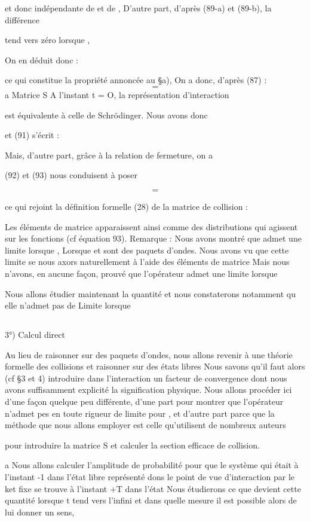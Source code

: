 {{{et donc indépendante de  et de ,
D'autre part, d'après (89-a) et (89-b), la différence

tend vers zéro lorsque ,

On en déduit donc :

ce qui constitue la propriété annoncée au \S a),
On a donc, d'après (87) :
\[
\tag{91}=
\]
a Matrice S
A l'instant t = O, la représentation d'interaction

est équivalente à celle de Schrödinger. Nous avons donc

et (91) s'écrit :

Mais, d'autre part, grâce à la relation de fermeture, on a


(92) et (93) nous conduisent à poser

\[
\tag{94}=
\]

ce qui rejoint la définition formelle (28) de la matrice de collision :

Les éléments de matrice  apparaissent ainsi comme des distributions
qui agissent sur les fonctions (cf équation 93).
Remarque : 
Nous avons montré que  admet une limite lorsque
, Lorsque  et  sont des paquets d'ondes.
Nous avons vu que cette limite se nous axors naturellement à l'aide
des éléments de matrice
Mais nous n'avons, en aucune façon, prouvé que l'opérateur 
admet une limite lorsque 

Nous allons étudier maintenant la quantité
et nous constaterons notamment qu elle n'admet pas de Limite lorsque

\subsection{}%
3°) Calcul direct 

Au lieu de raisonner sur des paquets d'ondes, nous allons revenir
à une théorie formelle des collisions et raisonner sur des états libres
Nous savons qu'il faut alors (cf \S 3 et 4) introduire dans l'interaction un
facteur de convergence dont nous avons suffisamment explicité la signification
physique. Nous allons procéder ici d'une façon quelque peu différente,
d'une part pour montrer que l'opérateur  n'admet pes en toute rigueur de limite
pour , et d'autre part parce que la
méthode que nous allons employer est celle qu'utilisent de nombreux auteurs

pour introduire la matrice S et calculer la section efficace de collision.


a Nous allons calculer l'amplitude de probabilité
 pour que le système qui était à l'instant -1 dans l'état libre représenté dons
 le point de vue d'interaction par le ket fixe  se trouve à l'instant +T dans
l'état Nous étudierons ce que devient cette quantité lorsque t tend vers
l'infini et dans quelle mesure il est possible alors
de lui donner un sens,

}}}
